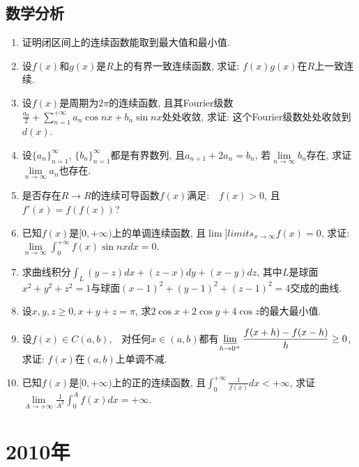 \documentclass[12pt,a4paper,openany]{book}
\begin{document}
\subsection{数学分析}
\begin{enumerate}
\item 证明闭区间上的连续函数能取到最大值和最小值.

\item 设$f(x)$和$g(x)$是$R$上的有界一致连续函数, 求证: $f(x)g(x)$在$R$上一致连续.

\item 设$f(x)$是周期为$2\pi$的连续函数, 且其Fourier级数$\displaystyle\frac{a_0}{2} + \sum\limits_{n=1}^{+\infty}{a_n\cos{nx} + b_n\sin{nx}}$处处收敛, 求证: 这个Fourier级数处处收敛到$d(x)$.

\item 设$\{a_n\}_{n=1}^{\infty}$, $\{b_n\}_{n=1}^{\infty}$都是有界数列, 且$a_{n+1} + 2a_n = b_n$, 若$\lim\limits_{n \rightarrow \infty}{b_n}$存在, 求证$\lim\limits_{n \rightarrow \infty}{a_n}$也存在.

\item 是否存在$R \rightarrow R$的连续可导函数$f(x)$满足:　$f(x) > 0$, 且$f'(x) = f(f(x))$?

\item 已知$f(x)$是$[0, +\infty)$上的单调连续函数, 且$\lim]limits_{x \rightarrow \infty}{f(x)} = 0$, 求证: $\displaystyle\lim\limits_{n \rightarrow \infty}\int_{0}^{+\infty}{f(x)\sin{nx}dx} = 0$.

\item 求曲线积分$\displaystyle\int_{L}{(y - z)dx + (z - x) dy + (x - y)dz}$, 其中$L$是球面$x^2 + y^2 + z^2 = 1$与球面$(x-1)^2 + (y-1)^2 + (z-1)^2 = 4$交成的曲线.

\item 设$x, y, z \ge 0, x+y+z = \pi$, 求$2\cos{x} + 2\cos{y} + 4\cos{z}$的最大最小值.

\item 设$f(x) \in C(a, b)$,　对任何$x \in (a, b)$都有$\displaystyle\varliminf\limits_{h \rightarrow 0^+}{\frac{f(x + h) - f(x - h)}{h}} \ge 0$,　求证: $f(x)$在$(a, b)$上单调不减.

\item 已知$f(x)$是$[0, +\infty)$上的正的连续函数, 且$\displaystyle\int_{0}^{+\infty}{\frac{1}{f(x)}dx} < +\infty$, 求证$\displaystyle\lim\limits_{A \rightarrow +\infty}{\frac{1}{A^2}\int_{0}^{A}{f(x)dx}} = +\infty$.
\end{enumerate}

\section{2010年}
\end{document}
